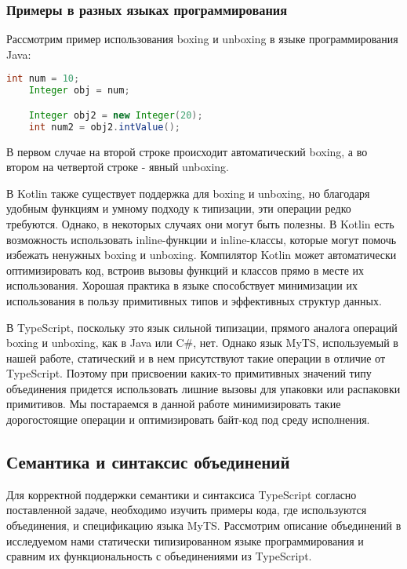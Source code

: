 \subsubsection{Примеры в разных языках программирования}

Рассмотрим пример использования boxing и unboxing в языке программирования Java:
\begin{lstlisting}[language=Java,label={lst:lstlisting22}]
    int num = 10;
    Integer obj = num;

    Integer obj2 = new Integer(20);
    int num2 = obj2.intValue();
\end{lstlisting}
В первом случае на второй строке происходит автоматический boxing, а во втором на четвертой строке - явный unboxing.

В Kotlin также существует поддержка для boxing и unboxing, но благодаря удобным функциям и умному подходу к типизации,
эти операции редко требуются.
Однако, в некоторых случаях они могут быть полезны.
В Kotlin есть возможность использовать inline-функции и inline-классы, которые могут помочь избежать ненужных boxing и
unboxing.
Компилятор Kotlin может автоматически оптимизировать код, встроив вызовы функций и классов прямо в месте их использования.
Хорошая практика в языке способствует минимизации их использования в пользу примитивных типов и эффективных структур данных.

В TypeScript, поскольку это язык сильной типизации, прямого аналога операций boxing и unboxing, как в Java или C\#, нет.
Однако язык MyTS, используемый в нашей работе, статический и в нем присутствуют такие операции в отличие от TypeScript.
Поэтому при присвоении каких-то примитивных значений типу объединения придется использовать лишние вызовы для упаковки
или распаковки примитивов.
Мы постараемся в данной работе минимизировать такие дорогостоящие операции и оптимизировать байт-код под среду исполнения.

\subsection{Семантика и синтаксис объединений}

Для корректной поддержки семантики и синтаксиса TypeScript согласно поставленной задаче, необходимо изучить примеры
кода, где используются объединения, и спецификацию языка MyTS\@.
Рассмотрим описание объединений в исследуемом нами статически типизированном языке программирования и сравним их
функциональность с объединениями из TypeScript.

